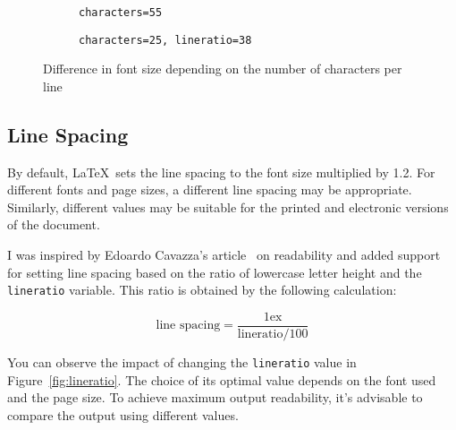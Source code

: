 \documentclass{ltugboat}
\begin{document}
\begin{figure*}[tbp]
  \begin{subfigure}[t]{0.45\textwidth}
\caption{\texttt{characters=55}}
\end{subfigure}
\hfill
\begin{subfigure}[t]{0.45\textwidth}
\caption{\texttt{characters=25, lineratio=38}}
\end{subfigure}
  \caption{Difference in font size depending on the number of characters per line}\label{fig:fontsize}
\end{figure*}

\subsection{Line Spacing}

By default, \LaTeX\ sets the line spacing to the font size multiplied by 1.2.
For different fonts and page sizes, a different line spacing may be
appropriate. Similarly, different values may be suitable for the printed and
electronic versions of the document.

I was inspired by Edoardo Cavazza's article~\cite{cavazza} on readability and
added support for setting line spacing based on the ratio of lowercase letter
height and the \texttt{lineratio} variable. This ratio is obtained by the
following calculation:

\[ \text{line spacing} = \frac{1\text{ex}}{\text{lineratio}/100} \]

You can observe the impact of changing the \texttt{lineratio} value in
Figure~\ref{fig:lineratio}. The choice of its optimal value depends on the font
used and the page size. To achieve maximum output readability, it's advisable
to compare the output using different values.
\end{document}
